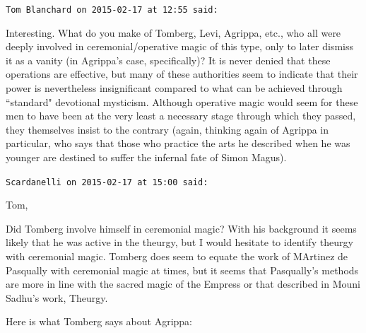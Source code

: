 \begin{footnotesize}\begin{sffamily}



\texttt{Tom Blanchard on 2015-02-17 at 12:55 said: }

Interesting. What do you make of Tomberg, Levi, Agrippa, etc., who all were deeply involved in ceremonial/operative magic of this type, only to later dismiss it as a vanity (in Agrippa's case, specifically)? It is never denied that these operations are effective, but many of these authorities seem to indicate that their power is nevertheless insignificant compared to what can be achieved through ``standard" devotional mysticism. Although operative magic would seem for these men to have been at the very least a necessary stage through which they passed, they themselves insist to the contrary (again, thinking again of Agrippa in particular, who says that those who practice the arts he described when he was younger are destined to suffer the infernal fate of Simon Magus).


\hfill

\texttt{Scardanelli on 2015-02-17 at 15:00 said: }

Tom,

Did Tomberg involve himself in ceremonial magic? With his background it seems likely that he was active in the theurgy, but I would hesitate to identify theurgy with ceremonial magic. Tomberg does seem to equate the work of MArtinez de Pasqually with ceremonial magic at times, but it seems that Pasqually's methods are more in line with the sacred magic of the Empress or that described in Mouni Sadhu's work, Theurgy. 

Here is what Tomberg says about Agrippa:


\end{sffamily}
\end{footnotesize}
